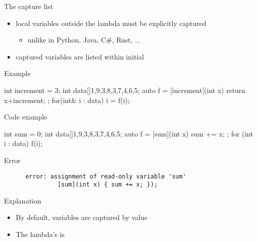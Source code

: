 \begin{frame}[fragile]
  \begin{block}{The capture list}
    \begin{itemize}
    \item local variables outside the lambda must be explicitly captured
    \begin{itemize}
      \item unlike in Python, Java, C\#, Rust, ...
    \end{itemize}
    \item captured variables are listed within initial \cppinline{[]}
    \end{itemize}
  \end{block}
  \pause
  \begin{exampleblock}{Example}
    \begin{cppcode*}{}
      int increment = 3;
      int data[]{1,9,3,8,3,7,4,6,5};
      auto f = [increment](int x) { return x+increment; };
      for(int& i : data) i = f(i);
    \end{cppcode*}
  \end{exampleblock}
\end{frame}

\begin{frame}[fragile]
  \begin{exampleblock}{Code example}
    \begin{cppcode}
      int sum = 0;
      int data[]{1,9,3,8,3,7,4,6,5};
      auto f = [sum](int x) { sum += x; };
      for (int i : data) f(i);
    \end{cppcode}
  \end{exampleblock}
  \pause
  \begin{alertblock}{Error}
    \begin{verbatim}
      error: assignment of read-only variable 'sum'
               [sum](int x) { sum += x; });
    \end{verbatim}
  \end{alertblock}
  \pause
  \begin{block}{Explanation}
    \begin{itemize}
      \item By default, variables are captured by value
      \item The lambda's  is 
    \end{itemize}
  \end{block}
\end{frame}

